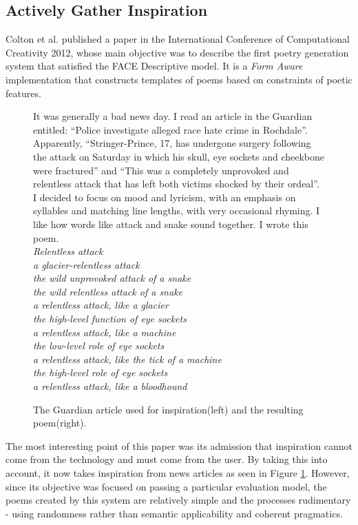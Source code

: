 \subsection{Actively Gather Inspiration}

Colton et al. published a paper in the International Conference of Computational Creativity 2012\cite{colton2012full}, whose main objective was to describe the first poetry generation system that satisfied the FACE Descriptive model\cite{colton2011computational}. It is a \textit{Form Aware}\cite{manurung2004evolutionary} implementation that constructs templates of poems based on constraints of poetic features. 

\begin{figure}[h!]
\begin{multicols}{2}
It was generally a bad news day. I read an article in
the Guardian entitled: “Police investigate alleged race
hate crime in Rochdale”. Apparently, “Stringer-Prince,
17, has undergone surgery following the attack on
Saturday in which his skull, eye sockets and
cheekbone were fractured” and “This was a
completely unprovoked and relentless attack that has
left both victims shocked by their ordeal”. I decided to
focus on mood and lyricism, with an emphasis on
syllables and matching line lengths, with very
occasional rhyming. I like how words like attack and
snake sound together. \columnbreak
I wrote this poem.\\
\textit{Relentless attack\\
a glacier-relentless attack\\
the wild unprovoked attack of a snake\\
the wild relentless attack of a snake\\
a relentless attack, like a glacier\\
the high-level function of eye sockets\\
a relentless attack, like a machine\\
the low-level role of eye sockets\\
a relentless attack, like the tick of a machine\\
the high-level role of eye sockets\\
a relentless attack, like a bloodhound
}
\end{multicols}
\caption{The Guardian article used for inspiration(left) and the resulting poem(right).}
\label{fig:face}
\end{figure}

The most interesting point of this paper was its admission that inspiration cannot come from the technology and must come from the user. By taking this into account, it now takes inspiration from news articles as seen in Figure \ref{fig:face}. However, since its objective was focused on passing a particular evaluation model, the poems created by this system are relatively simple and the processes rudimentary - using randomness rather than semantic applicability and coherent pragmatics.

